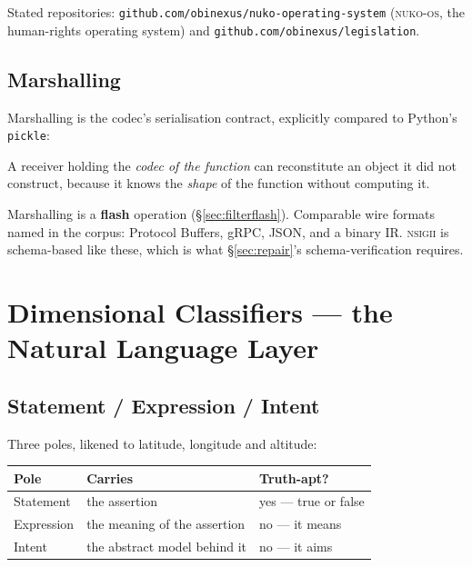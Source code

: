 \documentclass[11pt,a4paper]{article}
\newcommand{\NSIGII}{\textsc{nsigii}}
\begin{document}
Stated repositories: \texttt{github.com/obinexus/nuko-operating-system}
(\textsc{nuko-os}, the human-rights operating system) and
\texttt{github.com/obinexus/legislation}.

\subsection{Marshalling}
\label{sec:marshal}

Marshalling is the codec's serialisation contract, explicitly compared to
Python's \texttt{pickle}:

\begin{ruleblock}
A receiver holding the \emph{codec of the function} can reconstitute an object
it did not construct, because it knows the \emph{shape} of the function without
computing it.
\end{ruleblock}

Marshalling is a \textbf{flash} operation (\S\ref{sec:filterflash}). Comparable
wire formats named in the corpus: Protocol Buffers, gRPC, JSON, and a binary IR.
\NSIGII{} is schema-based like these, which is what \S\ref{sec:repair}'s
schema-verification requires.

\section{Dimensional Classifiers --- the Natural Language Layer}
\label{sec:lang}

\subsection{Statement / Expression / Intent}

Three poles, likened to latitude, longitude and altitude:

\begin{center}
\begin{tabular}{@{}lll@{}}
\toprule
\textbf{Pole} & \textbf{Carries} & \textbf{Truth-apt?} \\
\midrule
Statement  & the assertion                   & yes --- true or false \\
Expression & the meaning of the assertion    & no --- it means \\
Intent     & the abstract model behind it    & no --- it aims \\
\bottomrule
\end{tabular}
\end{center}
\end{document}
